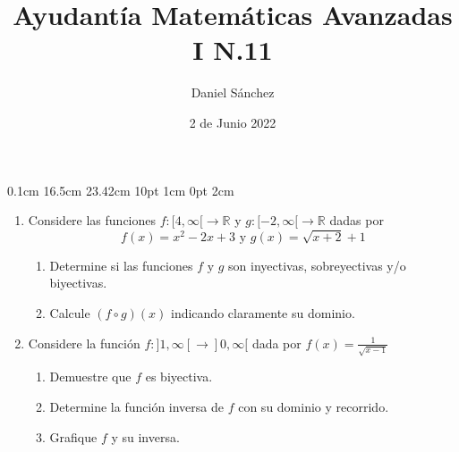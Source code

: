 \documentclass[12pt]{article}
\newcommand{\D}{\displaystyle}
\begin{document}
\setmargins{2.5cm}
{0.1cm}
{16.5cm}
{23.42cm}
{10pt}
{1cm}
{0pt}
{2cm}

\title{Ayudant\'ia Matem\'aticas Avanzadas I N.11}
\date{2 de Junio 2022}
\author{Daniel S\'anchez}
\maketitle

\begin{enumerate}
	\item Considere las funciones
	      $f: [4,\infty[\rightarrow \mathbb{R}$ y 
	      $g: [-2,\infty[\rightarrow \mathbb{R}$ dadas por 
	      $$f(x)=x^2-2x+3 \mbox{ y } g(x)=\sqrt{x+2}+1$$
	      \begin{enumerate}
		      \item Determine si las funciones $f \mbox{ y } g$
		            son inyectivas, sobreyectivas y/o biyectivas.
		      \item Calcule $(f \circ g)(x)$ indicando claramente su dominio.
	      \end{enumerate}
	\item Considere la funci\'on
	      $f: ]1,\infty[ \rightarrow ]0,\infty[$ dada por
	      $\D f(x)=\frac{1}{\sqrt{x-1}}$
	      \begin{enumerate}
		      \item Demuestre que $f$ es biyectiva.
		      \item Determine la funci\'on inversa de
		            $f$ con su dominio y recorrido.
		      \item Grafique $f$ y su inversa.
	      \end{enumerate}
\end{enumerate}
\end{document}
